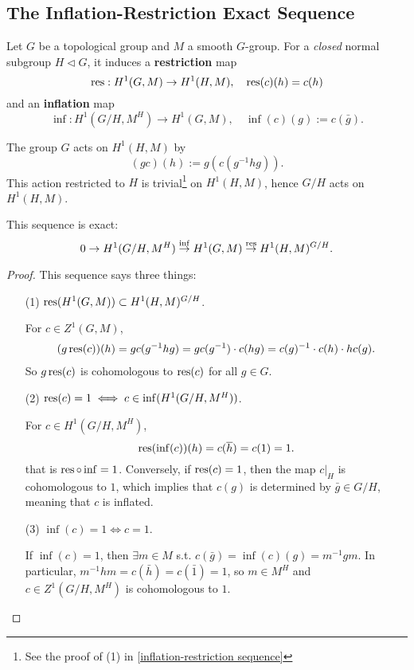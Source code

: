 \subsection{The Inflation-Restriction Exact Sequence}
Let $G$ be a topological group and $M$ a smooth $G$-group.
For a \textit{closed} normal subgroup $H\triangleleft G$, it induces a \textbf{restriction} map \[\operatorname{res} : H^1(G, M)\to H^1(H, M), \quad \operatorname{res}(c)(h) = c(h)\]
and an \textbf{inflation} map
\[\inf : H^1(G/H, M^H)\to H^1(G, M),\quad \inf(c)(g) := c(\bar g).\]

The group $G$ acts on $H^1(H, M)$ by \[(gc)(h) := g(c(g^{-1}hg)).\]
This action restricted to $H$ is trivial\footnote{
    See the proof of (1) in \cref{inflation-restriction sequence}} on $H^1(H, M)$, hence $G/H$ acts on $H^1(H, M)$.
\begin{proposition}\label{inflation-restriction sequence}
    This sequence is exact:\[
    0\to H^1(G/H, M^H)\stackrel{\inf}{\to} H^1(G, M)\stackrel{\operatorname{res}}{\to} H^1(H, M)^{G/H}.\]
\end{proposition}
\begin{proof}
    This sequence says three things:
\begin{enumerate}
\item [(1)] $\operatorname{res}(H^1(G, M))\subset H^1(H, M)^{G/H}$.\par
For $c\in Z^1(G, M)$, \begin{align*}
    (g\operatorname{res}(c))(h) = gc(g^{-1}hg)
    = gc(g^{-1})\cdot c(hg) = c(g)^{-1}\cdot c(h)\cdot hc(g).
\end{align*}
So $g\operatorname{res}(c)$ is cohomologous to $\operatorname{res}(c)$ for all $g\in G$. 
\item [(2)] $\operatorname{res}(c) = 1\iff c\in\inf(H^1(G/H, M^H))$.\par
For $c\in H^1(G/H, M^H)$, \[\operatorname{res}(\inf(c))(h) = c(\overline h) = c(1) = 1.\]
that is $\operatorname{res}\circ\inf = 1$. Conversely,
if $\operatorname{res}(c) = 1$, then the map $c|_H$ is cohomologous to $1$, which implies that $c(g)$ is determined by $\bar g\in G/H$, meaning that $c$ is inflated.
\item [(3)] $\inf(c) = 1\iff c = 1$.\par
If $\inf(c) = 1$,
then $\exists m\in M$ s.t. $c(\bar g) = \inf(c)(g) = m^{-1}gm$.
In particular, $m^{-1}hm = c(\bar h) = c(\bar{1}) = 1$, so $m\in M^H$ and $c\in Z^1(G/H, M^H)$ is cohomologous to $1$.\qedhere
\end{enumerate}
\end{proof}


